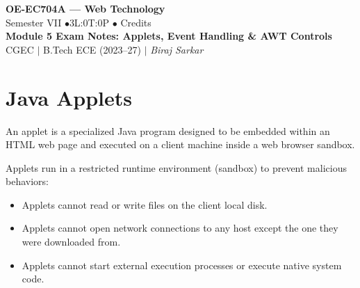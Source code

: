 \documentclass[12pt,a4paper]{article}
\begin{document}

\begin{center}
  {\LARGE\bfseries\color{myred} OE-EC704A --- Web Technology}\\[5pt]
  {\normalsize\color{mydark} Semester VII \quad$\bullet$\quad 3L:0T:0P \quad$\bullet$ Credits}\\[3pt]
  {\normalsize\color{myteal}\textbf{Module 5 Exam Notes: Applets, Event Handling \& AWT Controls}}\\[3pt]
  {\small\color{mydark} CGEC \;$|$\; B.Tech ECE (2023--27) \;$|$\; \textit{Biraj Sarkar}}
\end{center}
\vspace{2pt}
\noindent{\color{myred}\rule{\linewidth}{1.5pt}}
\vspace{2pt}

\hypersetup{linkcolor=mydark}
\tableofcontents
\hypersetup{linkcolor=myteal}
\newpage

\section{Java Applets}

An applet is a specialized Java program designed to be embedded within an HTML web page and executed on a client machine inside a web browser sandbox.

\begin{tcolorbox}[defbox, title={\textbf{Applet Security Sandbox}}]
Applets run in a restricted runtime environment (sandbox) to prevent malicious behaviors:
\begin{itemize}[leftmargin=*, itemsep=3pt]
  \item Applets cannot read or write files on the client local disk.
  \item Applets cannot open network connections to any host except the one they were downloaded from.
  \item Applets cannot start external execution processes or execute native system code.
\end{itemize}
\end{tcolorbox}
\end{document}
